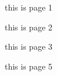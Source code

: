 \documentclass{beamer}
\begin{document}
\begin{frame}
this is page 1
\end{frame}

\begin{frame}
this is page 2
\end{frame}

\begin{frame}
this is page 3
\note{~}
\end{frame}

\begin{frame}
this is page 5
\end{frame}
\end{document}
